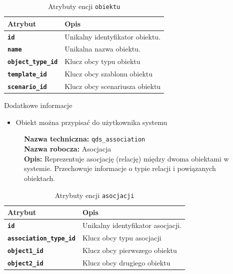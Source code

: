 \begin{table}[H]
    \centering
    \renewcommand{\arraystretch}{1.6}
    \begin{tabular}{|>{\bfseries}l|p{}|}
        \hline
        \rowcolor[HTML]{EFEFEF} \textbf{Atrybut} & \textbf{Opis} \\
        \hline
        \texttt{id} & Unikalny identyfikator obiektu. \\
        \hline
        \texttt{name} & Unikalna nazwa obiektu. \\
        \hline
        \texttt{object\_type\_id} & Klucz obcy typu obiektu \\
        \hline
        \texttt{template\_id} & Klucz obcy szablonu obiektu \\
        \hline
        \texttt{scenario\_id} & Klucz obcy scenariusza obiektu \\
        \hline
    \end{tabular}
    \caption{Atrybuty encji \texttt{obiektu}}
\end{table}

Dodatkowe informacje
\begin{itemize}
    \item Obiekt można przypisać do użytkownika systemu
\end{itemize}

\begin{figure}[H]
    \centering
    \begin{minipage}{0.8\textwidth}
        \begin{framed}
            \noindent\textbf{\large Nazwa techniczna:} \texttt{qds\_association} \\
            \textbf{\large Nazwa robocza:} Asocjacja \\
            \textbf{\large Opis:} Reprezentuje asocjację (relację) między dwoma obiektami w systemie.
            Przechowuje informacje o typie relacji i powiązanych obiektach.
        \end{framed}
    \end{minipage}
\end{figure}

\begin{table}[H]
    \centering
    \renewcommand{\arraystretch}{1.6}
    \begin{tabular}{|>{\bfseries}l|p{}|}
        \hline
        \rowcolor[HTML]{EFEFEF} \textbf{Atrybut} & \textbf{Opis} \\
        \hline
        \texttt{id} & Unikalny identyfikator asocjacji. \\
        \hline
        \texttt{association\_type\_id} & Klucz obcy typu asocjacji \\
        \hline
        \texttt{object1\_id} & Klucz obcy pierwszego obiektu \\
        \hline
        \texttt{object2\_id} & Klucz obcy drugiego obiektu \\
        \hline
    \end{tabular}
    \caption{Atrybuty encji \texttt{asocjacji}}
\end{table}

